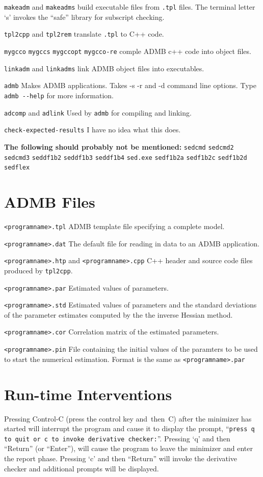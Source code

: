\documentclass[a4paper,10pt,notumble]{leaflet}
\begin{document}
\verb+makeadm+ and \verb+makeadms+ build executable files from 
\verb+.tpl+ files. The terminal letter `s' invokes the ``safe''
library for subscript checking.

\verb+tpl2cpp+ and \verb+tpl2rem+ translate \verb+.tpl+ to C++ code.

\verb+mygcco+ \verb+mygccs+ \verb+mygccopt+ \verb+mygcco-re+ comple
ADMB c++ code into object files.

\verb+linkadm+ and \verb+linkadms+ link ADMB object files into
executables.

\verb+admb+ Makes ADMB applications. Takes -s -r and -d command line
options. Type \verb+admb --help+ for more information.

\verb+adcomp+ and \verb+adlink+ Used by \verb+admb+ for compiling and
linking.

\verb+check-expected-results+ I have no idea what this does.

{\bf The following should probably not be mentioned:}
\verb+sedcmd+
\verb+sedcmd2+
\verb+sedcmd3+
\verb+seddf1b2+
\verb+seddf1b3+
\verb+seddf1b4+
\verb+sed.exe+
\verb+sedf1b2a+
\verb+sedf1b2c+
\verb+sedf1b2d+
\verb+sedflex+

\section {ADMB Files}

\verb+<programname>.tpl+ ADMB template file specifying a complete
model.

\verb+<programname>.dat+ The default file for reading in data to an
ADMB application.

\verb+<programname>.htp+ and \verb+<programname>.cpp+ C++ header and
source code files produced by \verb+tpl2cpp+.

\verb+<programname>.par+ Estimated values of parameters.

\verb+<programname>.std+ Estimated values of parameters and the
standard deviations of the parameter estimates computed by the the inverse
Hessian method.

\verb+<programname>.cor+ Correlation matrix of the estimated
parameters.

\verb+<programname>.pin+ File containing the initial values of the
paramters to be used to start the numerical estimation. Format is the
same as \verb+<programname>.par+ 

\section{Run-time Interventions}
Pressing Control-C (press the control key and~then~C) after the
minimizer has started will interrupt the program and cause it to
display the prompt, 
``\verb|press q to quit or c to invoke derivative checker:|''.
Pressing `q' and then ``Return'' (or ``Enter''), will cause the
program to leave the minimizer and enter the report phase. Pressing
`c' and then ``Return'' will invoke the derivative checker and
additional prompts will be displayed.
\end{document}
